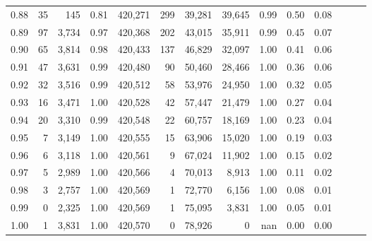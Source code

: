 \begin{tabular}{rrrrrrrrrrrrrr}
0.88 &      35 &    145 &  0.81 &  420,271 &      299 &  39,281 &  39,645 &  0.99 &  0.50 &      0.08 \\
0.89 &      97 &  3,734 &  0.97 &  420,368 &      202 &  43,015 &  35,911 &  0.99 &  0.45 &      0.07 \\
0.90 &      65 &  3,814 &  0.98 &  420,433 &      137 &  46,829 &  32,097 &  1.00 &  0.41 &      0.06 \\
0.91 &      47 &  3,631 &  0.99 &  420,480 &       90 &  50,460 &  28,466 &  1.00 &  0.36 &      0.06 \\
0.92 &      32 &  3,516 &  0.99 &  420,512 &       58 &  53,976 &  24,950 &  1.00 &  0.32 &      0.05 \\
0.93 &      16 &  3,471 &  1.00 &  420,528 &       42 &  57,447 &  21,479 &  1.00 &  0.27 &      0.04 \\
0.94 &      20 &  3,310 &  0.99 &  420,548 &       22 &  60,757 &  18,169 &  1.00 &  0.23 &      0.04 \\
0.95 &       7 &  3,149 &  1.00 &  420,555 &       15 &  63,906 &  15,020 &  1.00 &  0.19 &      0.03 \\
0.96 &       6 &  3,118 &  1.00 &  420,561 &        9 &  67,024 &  11,902 &  1.00 &  0.15 &      0.02 \\
0.97 &       5 &  2,989 &  1.00 &  420,566 &        4 &  70,013 &   8,913 &  1.00 &  0.11 &      0.02 \\
0.98 &       3 &  2,757 &  1.00 &  420,569 &        1 &  72,770 &   6,156 &  1.00 &  0.08 &      0.01 \\
0.99 &       0 &  2,325 &  1.00 &  420,569 &        1 &  75,095 &   3,831 &  1.00 &  0.05 &      0.01 \\
1.00 &       1 &  3,831 &  1.00 &  420,570 &        0 &  78,926 &       0 &   nan &  0.00 &      0.00 \\
\bottomrule
\end{tabular}
